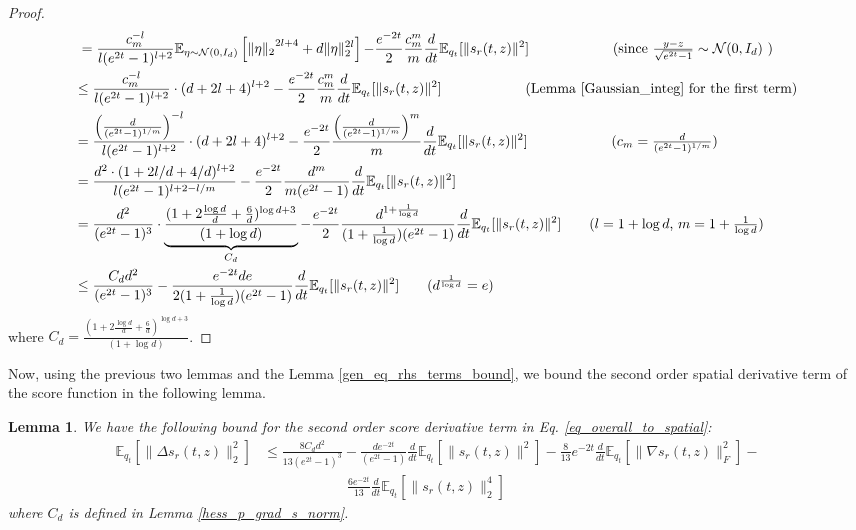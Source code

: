 \documentclass{article}
\newtheorem{lemma}{Lemma}[section]
\begin{document}
\begin{proof}
\begin{align*}
       &=\frac{c_m^{-l}}{l(e^{2t}-1)^{l+2}}\mathbb{E}_{\eta\sim\mathcal{N}(0,I_d)} \left[  {\|\eta\|_2}^{2l+4} + d\|\eta\|^{2l}_2 \right]   {-\frac{e^{-2t}}{2} \frac{c^m_m}{m}\frac{d}{dt}\mathbb{E}_{q_t}[\|s_r(t,z)\|^2]}    \qquad \qquad \tag{since $\frac{y-z}{\sqrt{e^{2t}-1}}\sim \mathcal{N}(0,I_d)$ } \\
       &{\leq  \frac{c_m^{-l}}{l(e^{2t}-1)^{l+2}} \cdot (d+2l+4)^{l+2}   -\frac{e^{-2t}}{2} \frac{c^m_m}{m}\frac{d}{dt}\mathbb{E}_{q_t}[\|s_r(t,z)\|^2]  \qquad \qquad \tag{Lemma \ref{Gaussian_integ} for the first term}} \\
       &{=  \frac{\left(\frac{d}{(e^{2t}-1)^{{1}/{m}}}\right)^{-l}}{l(e^{2t}-1)^{l+2}} \cdot (d+2l+4)^{l+2}  -\frac{e^{-2t}}{2} \frac{\left(\frac{d}{(e^{2t}-1)^{{1}/{m}}}\right)^m}{m}\frac{d}{dt}\mathbb{E}_{q_t}[\|s_r(t,z)\|^2]  \qquad \qquad \tag{$c_m=\frac{d}{(e^{2t}-1)^{{1}/{m}}}$}} \\
       &{=  \frac{d^{2}\cdot (1+2l/d+4/d)^{l+2}}{l(e^{2t}-1)^{l+2-l/m}}  -\frac{e^{-2t}}{2}  \frac{d^{m}}{m(e^{2t}-1)}\frac{d}{dt}\mathbb{E}_{q_t}[\|s_r(t,z)\|^2]  } \\
       &{=  \frac{d^2}{(e^{2t}-1)^{3}}\cdot \underbrace{\frac{(1+2\frac{\log d}{d}+\frac{6}{d})^{\log d+3}}{(1+\log d)}}_{C_d}  -\frac{e^{-2t}}{2}  \frac{d^{1+\frac{1}{\log d}}}{(1+\frac{1}{\log d})(e^{2t}-1)}\frac{d}{dt}\mathbb{E}_{q_t}[\|s_r(t,z)\|^2] } \tag{$l=1+\log d$, $m=1+\frac{1}{\log d}$} \\
       &{\leq  \frac{C_dd^2}{(e^{2t}-1)^{3}}    -  \frac{e^{-2t}de}{2(1+\frac{1}{\log d})(e^{2t}-1)}\frac{d}{dt}\mathbb{E}_{q_t}[\|s_r(t,z)\|^2]  } \tag{$d^{\frac{1}{\log d}}=e$} \\
    \end{align*}
    where $C_d =\frac{(1+2\frac{\log d}{d}+\frac{6}{d})^{\log d+3}}{(1+\log d)} $.
\end{proof}



\noindent 
Now, using the previous two lemmas and the Lemma \ref{gen_eq_rhs_terms_bound}, we bound the second order spatial derivative term of the score function in the following lemma.
\begin{lemma}
\label{Laplacian_score}
    We have the following bound for the second order score derivative term in Eq. \ref{eq_overall_to_spatial}:  
    \begin{align*}
       \mathbb{E}_{q_t}\left[\|\Delta s_r(t,z)\|_2^2\right] &\leq \frac{8C_d d^2}{13(e^{2t}-1)^{3}}    -  \frac{de^{-2t}}{(e^{2t}-1)} \frac{d}{dt}\mathbb{E}_{q_t}[\|s_r(t,z)\|^2]  -\frac{8}{13} e^{-2t}\frac{d}{dt}\mathbb{E}_{q_t}\left[\|\nabla s_r(t,z)\|_F^2\right] - \\
       & \qquad \qquad \qquad \frac{6e^{-2t}}{13}\frac{d}{dt}  \mathbb{E}_{q_t}\left[\|s_r(t,z)\|^4_2\right]
    \end{align*}
    where $C_d$ is defined in Lemma \ref{hess_p_grad_s_norm}.
\end{lemma}
\end{document}
